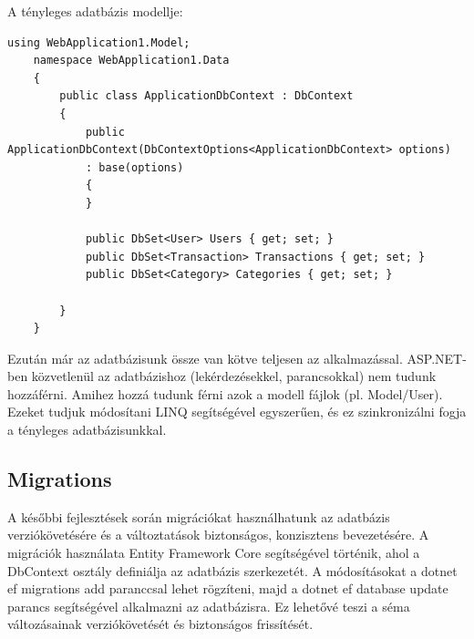 A tényleges adatbázis modellje:

\begin{lstlisting}[language={[Sharp]C}]
	using WebApplication1.Model;
	namespace WebApplication1.Data
	{
		public class ApplicationDbContext : DbContext
		{
			public ApplicationDbContext(DbContextOptions<ApplicationDbContext> options)
			: base(options)
			{
			}
			
			public DbSet<User> Users { get; set; }
			public DbSet<Transaction> Transactions { get; set; }
			public DbSet<Category> Categories { get; set; }
			
		}
	}
\end{lstlisting}

Ezután már az adatbázisunk össze van kötve teljesen az alkalmazással. ASP.NET-ben közvetlenül az adatbázishoz (lekérdezésekkel, parancsokkal) nem tudunk hozzáférni. Amihez hozzá tudunk férni azok a modell fájlok (pl. Model/User). Ezeket tudjuk módosítani LINQ segítségével egyszerűen, és ez szinkronizálni fogja
a tényleges adatbázisunkkal.

\subsection{Migrations}
A későbbi fejlesztések során migrációkat használhatunk az adatbázis verziókövetésére és a változtatások biztonságos, konzisztens bevezetésére. A migrációk használata Entity Framework Core segítségével történik, ahol a DbContext osztály definiálja az adatbázis szerkezetét. A módosításokat a dotnet ef migrations add paranccsal lehet rögzíteni, majd a dotnet ef database update parancs segítségével alkalmazni az adatbázisra. Ez lehetővé teszi a séma változásainak verziókövetését és biztonságos frissítését.

